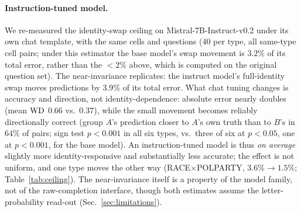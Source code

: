 \paragraph{Instruction-tuned model.}
We re-measured
the identity-swap ceiling on Mistral-7B-Instruct-v0.2 under its own chat
template, with the same cells and questions (40 per type, all same-type
cell pairs; under this estimator the base model's swap movement is
$3.2\%$ of its total error, rather than the ${<}2\%$ above, which is
computed on the original question set). The near-invariance replicates:
the instruct model's full-identity swap moves predictions by $3.9\%$ of
its total error. What chat tuning changes is accuracy and direction, not
identity-dependence: absolute error nearly doubles (mean $\mathrm{WD}$
$0.66$ vs.\ $0.37$), while the small movement becomes reliably
directionally correct (group $A$'s prediction closer to $A$'s own truth
than to $B$'s in $64\%$ of pairs; sign test $p<0.001$ in all six types,
vs.\ three of six at $p<0.05$, one at $p<0.001$, for the base model). An
instruction-tuned model is thus \emph{on average} slightly more
identity-responsive and substantially less accurate; the effect is not
uniform, and one type moves the other way
(RACE$\times$POLPARTY, $3.6\%\!\to\!1.5\%$; Table~\ref{tab:ceiling}). The
near-invariance itself is a property of the model family, not of the
raw-completion interface, though both estimates assume the
letter-probability read-out (Sec.~\ref{sec:limitations}).

